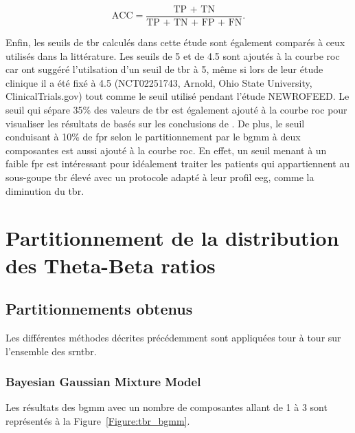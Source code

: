 \begin{equation}
\label{eq:tbr_accuracy}
\text{ACC} = \frac{\text{TP + TN}}{\text{TP + TN + FP + FN}}.
\end{equation}

Enfin, les seuils de \gls{tbr} calculés dans cette étude sont également comparés à ceux utilisés dans la littérature. Les seuils de 5 et de 4.5 sont
ajoutés à la courbe \gls{roc} car \citet{Kerson2013} ont suggéré l'utilsation d'un seuil de \gls{tbr} à 5, même si lors de leur étude clinique il a été fixé 
à 4.5 (NCT02251743, Arnold, Ohio State University, ClinicalTrials.gov) tout comme le seuil utilisé pendant l'étude NEWROFEED. Le seuil qui sépare 35\% des valeurs de 
\gls{tbr} est également ajouté à la courbe \gls{roc} pour visualiser les résultats de \citet{Zhang2017} basés sur les conclusions de \citet{Clarke2011}.
De plus, le seuil conduisant à 10\% de \gls{fpr} selon le partitionnement par le \gls{bgmm} à deux composantes est aussi ajouté à la courbe \gls{roc}. 
En effet, un seuil menant à un faible \gls{fpr} est intéressant pour idéalement traiter les patients qui appartiennent au sous-goupe \gls{tbr} élevé avec 
un protocole adapté à leur profil \gls{eeg}, comme la diminution du \gls{tbr}.

\section{Partitionnement de la distribution des Theta-Beta ratios}

\subsection{Partitionnements obtenus}

Les différentes méthodes décrites précédemment sont appliquées tour à tour sur l'ensemble des \gls{srntbr}.

\subsubsection{Bayesian Gaussian Mixture Model}

Les résultats des \gls{bgmm} avec un nombre de composantes allant de 1 à 3 sont représentés à la Figure~\ref{Figure:tbr_bgmm}. 

